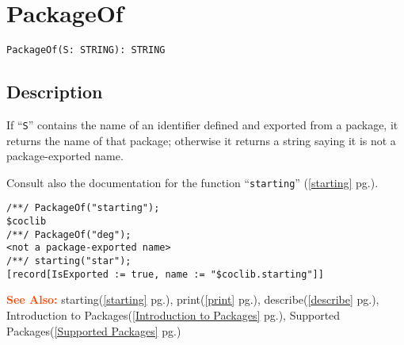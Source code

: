 \documentclass[a4paper]{mybook}
\newenvironment{command}{}{} %
\newcommand\SeeAlso{\par\textcolor{OrangeRed}{\textbf{\large See Also: }}}
\begin{document}
\section{PackageOf}
\label{PackageOf}
\begin{command} %


\begin{Verbatim}[label=syntax, rulecolor=\color{MidnightBlue},
frame=single]
PackageOf(S: STRING): STRING
\end{Verbatim}


\subsection*{Description}

If ``\verb&S&'' contains the name of an identifier defined and exported from
a package, it returns the name of that package; otherwise it returns a
string saying it is not a package-exported name.
\par 
Consult also the documentation for the function ``\verb&starting&'' (\ref{starting} pg.\pageref{starting}).
\begin{Verbatim}[label=example, rulecolor=\color{PineGreen}, frame=single]
/**/ PackageOf("starting");
$coclib
/**/ PackageOf("deg");
<not a package-exported name>
/**/ starting("star");
[record[IsExported := true, name := "$coclib.starting"]]
\end{Verbatim}


\SeeAlso %
  starting(\ref{starting} pg.\pageref{starting}), 
    print(\ref{print} pg.\pageref{print}), 
    describe(\ref{describe} pg.\pageref{describe}), 
    Introduction to Packages(\ref{Introduction to Packages} pg.\pageref{Introduction to Packages}), 
    Supported Packages(\ref{Supported Packages} pg.\pageref{Supported Packages})
\end{command} %
\end{document}
